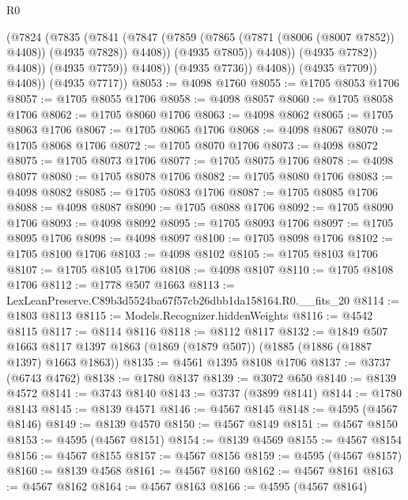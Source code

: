 \begin{lexlean}{R0}
\begin{coremodule}
                                (@7824
                                  (@7835
                                    (@7841
                                      (@7847
                                        (@7859
                                          (@7865 (@7871 (@8006 (@8007 @7852)) @4408))
                                          (@4935 @7828))
                                        @4408))
                                    (@4935 @7805))
                                  @4408))
                              (@4935 @7782))
                            @4408))
                        (@4935 @7759))
                      @4408))
                  (@4935 @7736))
                @4408))
            (@4935 @7709))
          @4408))
      (@4935 @7717))
@8053 := @4098 @1760
@8055 := @1705 @8053 @1706
@8057 := @1705 @8055 @1706
@8058 := @4098 @8057
@8060 := @1705 @8058 @1706
@8062 := @1705 @8060 @1706
@8063 := @4098 @8062
@8065 := @1705 @8063 @1706
@8067 := @1705 @8065 @1706
@8068 := @4098 @8067
@8070 := @1705 @8068 @1706
@8072 := @1705 @8070 @1706
@8073 := @4098 @8072
@8075 := @1705 @8073 @1706
@8077 := @1705 @8075 @1706
@8078 := @4098 @8077
@8080 := @1705 @8078 @1706
@8082 := @1705 @8080 @1706
@8083 := @4098 @8082
@8085 := @1705 @8083 @1706
@8087 := @1705 @8085 @1706
@8088 := @4098 @8087
@8090 := @1705 @8088 @1706
@8092 := @1705 @8090 @1706
@8093 := @4098 @8092
@8095 := @1705 @8093 @1706
@8097 := @1705 @8095 @1706
@8098 := @4098 @8097
@8100 := @1705 @8098 @1706
@8102 := @1705 @8100 @1706
@8103 := @4098 @8102
@8105 := @1705 @8103 @1706
@8107 := @1705 @8105 @1706
@8108 := @4098 @8107
@8110 := @1705 @8108 @1706
@8112 := @1778 @507 @1663
@8113 := LexLeanPreserve.C89b3d5524ba67f57cb26dbb1da158164.R0.__fits_20
@8114 := @1803 @8113
@8115 := Models.Recognizer.hiddenWeights
@8116 := @4542 @8115
@8117 := @8114 @8116
@8118 := @8112 @8117
@8132 := @1849
    @507
    @1663
    @8117
    @1397
    @1863
    (@1869 (@1879 @507))
    (@1885 (@1886 (@1887 @1397) @1663 @1863))
@8135 := @4561 @1395 @8108 @1706
@8137 := @3737 (@6743 @4762)
@8138 := @1780 @8137
@8139 := @3072 @650
@8140 := @8139 @4572
@8141 := @3743 @8140
@8143 := @3737 (@3899 @8141)
@8144 := @1780 @8143
@8145 := @8139 @4571
@8146 := @4567 @8145
@8148 := @4595 (@4567 @8146)
@8149 := @8139 @4570
@8150 := @4567 @8149
@8151 := @4567 @8150
@8153 := @4595 (@4567 @8151)
@8154 := @8139 @4569
@8155 := @4567 @8154
@8156 := @4567 @8155
@8157 := @4567 @8156
@8159 := @4595 (@4567 @8157)
@8160 := @8139 @4568
@8161 := @4567 @8160
@8162 := @4567 @8161
@8163 := @4567 @8162
@8164 := @4567 @8163
@8166 := @4595 (@4567 @8164)

\end{coremodule}
\end{lexlean}
